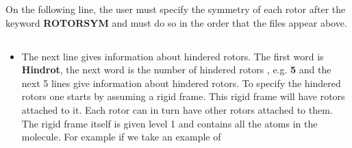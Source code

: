 \documentclass[a4paper,12pt]{article}
\begin{document}
On the following line, the user must specify the symmetry of each rotor after the keyword \textbf{ROTORSYM} and must do so in the order that the files appear above.



\subsection{}

\begin{itemize}
\item The next line gives information about hindered rotors. The first word is \textbf{Hindrot}, the next word is the number of hindered rotors , e.g. \textbf{5} and the next 5 lines give information about hindered rotors. To specify the hindered rotors one starts by assuming a rigid frame. This rigid frame will have rotors attached to it. Each rotor can in turn have other rotors attached to them. The rigid frame itself is given level 1 and contains all the atoms in the molecule. For example if we take an example of

\end{itemize}
\end{document}

